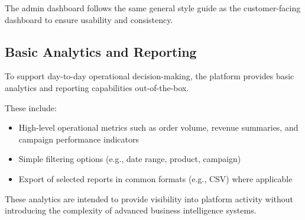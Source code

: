 The admin dashboard follows the same general style guide as the customer-facing
dashboard to ensure usability and consistency.

\subsection{Basic Analytics and Reporting}

To support day-to-day operational decision-making, the platform provides basic
analytics and reporting capabilities out-of-the-box.

These include:
\begin{itemize}[leftmargin=1.5em]
    \item High-level operational metrics such as order volume, revenue summaries,
    and campaign performance indicators
    \item Simple filtering options (e.g., date range, product, campaign)
    \item Export of selected reports in common formats (e.g., CSV) where applicable
\end{itemize}

These analytics are intended to provide visibility into platform activity without
introducing the complexity of advanced business intelligence systems.
